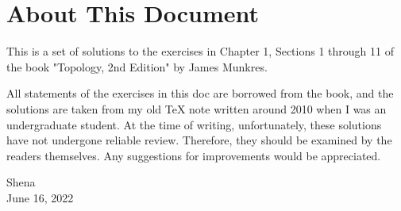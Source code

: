 \documentclass[a4paper,12pt]{article}
\begin{document}
\section*{About This Document}
This is a set of solutions to the exercises in Chapter 1, Sections 1 through 11 of the book "Topology, 2nd Edition" by James Munkres.

All statements of the exercises in this doc are borrowed from the book, and the solutions are taken from my old TeX note written around 2010 when I was an undergraduate student. At the time of writing, unfortunately, these solutions have not undergone reliable review. Therefore, they should be examined by the readers themselves. Any suggestions for improvements would be appreciated.

\begin{flushright}
	Shena\\
	June 16, 2022
\end{flushright}
\end{document}
